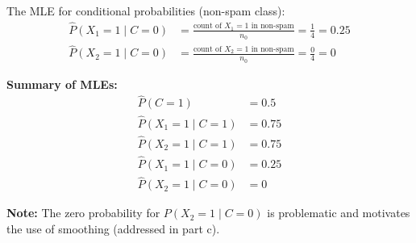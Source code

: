 \documentclass[12pt]{article}
\begin{document}
\begin{solution}
The MLE for conditional probabilities (non-spam class):
\begin{align}
\hat{P}(X_1 = 1 \mid C = 0) &= \frac{\text{count of } X_1 = 1 \text{ in non-spam}}{n_0} = \frac{1}{4} = 0.25 \\
\hat{P}(X_2 = 1 \mid C = 0) &= \frac{\text{count of } X_2 = 1 \text{ in non-spam}}{n_0} = \frac{0}{4} = 0
\end{align}

\textbf{Summary of MLEs:}
\[
\boxed{
\begin{aligned}
\hat{P}(C = 1) &= 0.5 \\
\hat{P}(X_1 = 1 \mid C = 1) &= 0.75 \\
\hat{P}(X_2 = 1 \mid C = 1) &= 0.75 \\
\hat{P}(X_1 = 1 \mid C = 0) &= 0.25 \\
\hat{P}(X_2 = 1 \mid C = 0) &= 0
\end{aligned}
}
\]

\textbf{Note:} The zero probability for $P(X_2 = 1 \mid C = 0)$ is problematic and motivates the use of smoothing (addressed in part c).
\end{solution}
\end{document}

